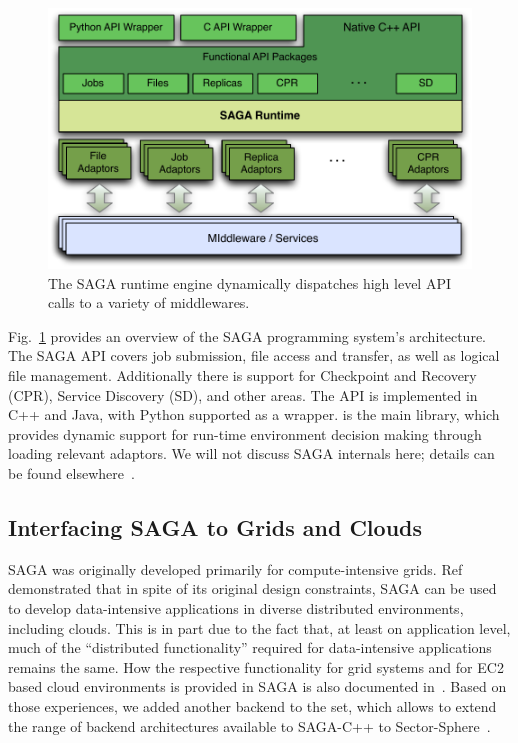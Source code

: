 \documentclass[3p,twocolumn]{elsarticle}
\begin{document}
\begin{figure}[t]
 \includegraphics[scale=0.5]{saga-figure02.pdf}
 \caption{The SAGA runtime engine dynamically dispatches high level
          API calls to a variety of middlewares.}
 \label{fig:saga}
\end{figure}

Fig.~\ref{fig:saga} provides an overview of the SAGA programming
system's architecture.  The SAGA API covers job submission, file
access and transfer, as well as logical file management.  Additionally
there is support for Checkpoint and Recovery (CPR), Service Discovery
(SD), and other areas.  The API is implemented in C++ and Java, with
Python supported as a wrapper.  is the main library,
which provides dynamic support for run-time environment decision
making through loading relevant adaptors. We will not discuss SAGA
internals here; details can be found elsewhere~\cite{saga_url,Kaiser:2006qp}.


\subsection{Interfacing SAGA to Grids and Clouds}

SAGA was originally developed primarily for compute-intensive grids.
Ref~\cite{saga_ccgrid09} demonstrated that in spite of its original
design constraints, SAGA can be used to develop data-intensive
applications in diverse distributed environments, including clouds.
This is in part due to the fact that, at least on application level,
much of the ``distributed functionality'' required for data-intensive
applications remains the same.  How the respective functionality for
grid systems and for EC2 based cloud environments is provided in SAGA
is also documented in~\cite{saga_ccgrid09}.  Based on those
experiences, we added another backend to the set, which allows to
extend the range of backend architectures available to SAGA-C++ to
Sector-Sphere~\cite{sectorsphere09}.
\end{document}
